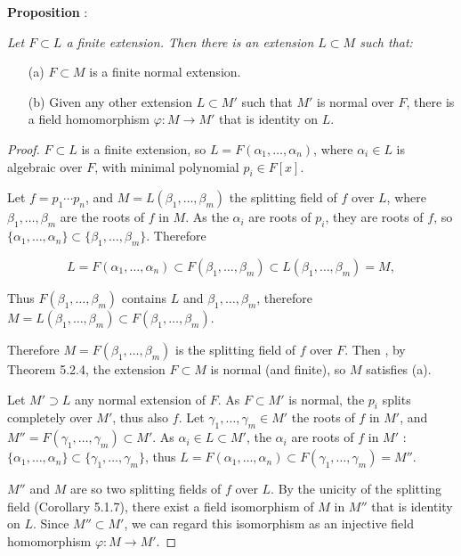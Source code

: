 \documentclass[11pt,a4paper]{article}
\begin{document}
{\bf Proposition} :  {\it Let $F \subset L$ a finite extension. Then there is an extension $L\subset M$ such that:
\begin{enumerate}
\item[(a)] $F \subset M$ is a finite normal extension.

\item[(b)]Given any other extension $L\subset M'$ such that $M'$ is normal over $F$, there is a field homomorphism $\varphi: M \to M'$ that is identity on $L$.

\end{enumerate}
}
\begin{proof}
  $F \subset L$ is a finite extension, so $L = F(\alpha_1,\ldots,\alpha_n)$, where $\alpha_i \in L$ is algebraic over $F$, with minimal polynomial $p_i \in F[x]$.
  
Let $f = p_1\cdots p_n$, and $M = L(\beta_1,\ldots,\beta_m)$ the splitting field of $f$ over $L$, where $\beta_1,\ldots,\beta_m$ are the roots of $f$ in $M$. 
As the $\alpha_i$ are roots of $p_i$, they are roots of $f$, so  $\{\alpha_1,\ldots,\alpha_n\} \subset\{\beta_1,\ldots,\beta_m\}$. Therefore

$$L = F(\alpha_1,\ldots,\alpha_n) \subset F(\beta_1,\ldots,\beta_m) \subset L(\beta_1,\ldots,\beta_m) = M,$$

Thus $F(\beta_1,\ldots,\beta_m)$ contains  $L$ and $\beta_1,\ldots,\beta_m$, therefore $M = L(\beta_1,\ldots,\beta_m) \subset F(\beta_1,\ldots,\beta_m)$.

Therefore $M = F(\beta_1,\ldots,\beta_m)$ is the splitting field of $f$ over $F$. Then , by Theorem 5.2.4, the extension $F \subset M$ is normal (and finite), so $M$ satisfies (a).

Let $M' \supset L$ any normal extension of $F$. As $F \subset M'$ is normal, the $p_i$ splits completely over $M'$, thus also $f$. Let $\gamma_1,\ldots,\gamma_m \in M'$ the roots of $f$ in $M'$, and $M'' = F(\gamma_1,\ldots,\gamma_m) \subset M'$. As $\alpha_i  \in L \subset M'$, the $\alpha_i$ are roots of $f$ in $M'$ : $\{\alpha_1,\ldots,\alpha_n\}\subset\{\gamma_1,\ldots,\gamma_m\}$, thus $L = F(\alpha_1,\ldots,\alpha_n) \subset F(\gamma_1,\ldots,\gamma_m) = M''$.

$M''$ and $M$ are so two splitting fields of $f$ over $L$. By the unicity of the splitting field (Corollary 5.1.7), there exist a field isomorphism of $M$ in $M''$  that is identity on $L$. Since $M'' \subset M'$, we can regard this isomorphism as an injective field homomorphism $\varphi : M \to M'$.
\end{proof}
\end{document}
